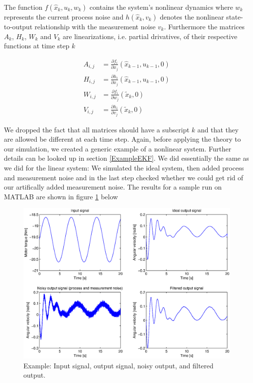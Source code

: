 The function \(f(\hat{x}_k,u_k,w_k)\) contains the system's nonlinear dynamics where \(w_k\) represents the current process noise and \(h(\hat{x}_k, v_k)\) denotes the nonlinear state-to-output relationship with the measurement noise \(v_k\). Furthermore the matrices \(A_k\), \(H_k\), \(W_k\) and \(V_k\) are linearizations, i.e. partial drivatives, of their respective functions at time step \(k\)
\newline
\begin{enumerate}
	\begin{equation}\label{Linearizations}
		\begin{aligned}
    			A_{i,j}&= \frac{\partial f_i}{\partial x_j}(\hat{x}_{k-1},u_{k-1},0) \\
    			H_{i,j}&= \frac{\partial h_i}{\partial x_j}(\hat{x}_{k-1},u_{k-1},0) \\
			W_{i,j}&= \frac{\partial f_i}{\partial w_j}(\tilde{x}_k,0) \\
			V_{i,j}&= \frac{\partial h_i}{\partial v_j}(\tilde{x}_k,0)
  		\end{aligned}
	\end{equation}
\end{enumerate}

We dropped the fact that all matrices should have a subscript \(k\) and that they are allowed be different at each time step. Again, before applying the theory to our simulation, we created a generic example of a nonlinear system. Further details can be looked up in section \ref{ExampleEKF}. We did essentially the same as we did for the linear system: We simulated the ideal system, then added process and measurement noise and in the last step checked whether we could get rid of our artifically added measurement noise. The results for a sample run on MATLAB are shown in figure \ref{EKFchart} below

\begin{figure}[htbp]
	\centering
    	\includegraphics[width=12cm]{./3_KalmanFilter/EKFchart}
  	\caption{Example: Input signal, output signal, noisy output, and filtered output.}
  	\label{EKFchart}
\end{figure}


